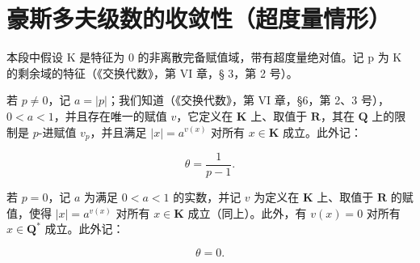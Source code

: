 \section{豪斯多夫级数的收敛性（超度量情形）}

本段中假设 K 是特征为 0 的非离散完备赋值域，带有超度量绝对值。记 p 为 K 的剩余域的特征（《交换代数》，第 VI 章，§ 3，第 2 号）。

若 \(p \neq 0\)，记 \(a = |p|\)；我们知道（《交换代数》，第 VI 章，§6，第 2、3 号），\(0 < a < 1\)，并且存在唯一的赋值 \(v\)，它定义在 \(\mathbf{K}\) 上、取值于 \(\mathbf{R}\)，其在 \(\mathbf{Q}\) 上的限制是 \(p\)-进赋值 \(v_p\)，并且满足 \(|x| = a^{v(x)}\) 对所有 \(x \in \mathbf{K}\) 成立。此外记：

\[
\theta = \frac {1}{p - 1}.\tag{1}
\]

若 \(p = 0\)，记 \(a\) 为满足 \(0 < a < 1\) 的实数，并记 \(v\) 为定义在 \(\mathbf{K}\) 上、取值于 \(\mathbf{R}\) 的赋值，使得 \(|x| = a^{v(x)}\) 对所有 \(x \in \mathbf{K}\) 成立（同上）。此外，有 \(v(x) = 0\) 对所有 \(x \in \mathbf{Q}^*\) 成立。此外记：

\[
\theta = 0.\tag{2}
\]

